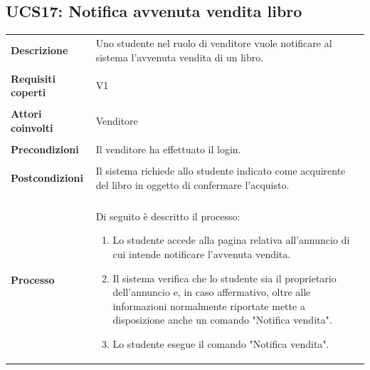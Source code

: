 \documentclass[10pt,a4paper]{report}
\begin{document}
	\subsection{UCS17: Notifica avvenuta vendita libro}
	\begin{tabular}{lp{}}
		\textbf{Descrizione}&Uno studente nel ruolo di venditore vuole notificare al sistema l'avvenuta vendita di un libro.\\
		\\
		\textbf{Requisiti coperti}&V1\\
		\\
		\textbf{Attori coinvolti}&Venditore\\
		\\
		\textbf{Precondizioni}&Il venditore ha effettuato il login.\\
		\\
		\textbf{Postcondizioni}&Il sistema richiede allo studente indicato come acquirente del libro in oggetto di confermare l'acquisto.\\
		\\
		\textbf{Processo}&Di seguito è descritto il processo:
		\begin{enumerate}
			\item Lo studente accede alla pagina relativa all'annuncio di cui intende notificare l'avvenuta vendita.
			\item Il sistema verifica che lo studente sia il proprietario dell'annuncio e, in caso affermativo, oltre alle informazioni normalmente riportate mette a disposizione anche un comando "Notifica vendita".
			\item Lo studente esegue il comando "Notifica vendita".
			

\end{enumerate}
\end{tabular}
\end{document}
